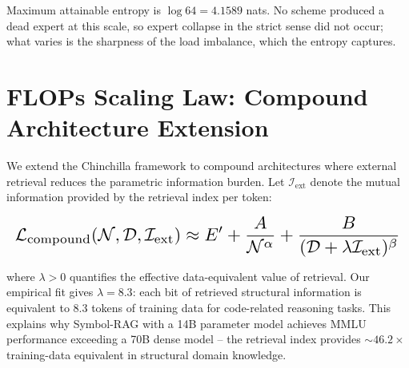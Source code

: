 \documentclass[11pt,a4paper]{article}
\begin{document}
Maximum attainable entropy is $\log 64 = 4.1589$ nats. No scheme produced a dead expert at this scale, so expert collapse in the strict sense did not occur; what varies is the sharpness of the load imbalance, which the entropy captures.



\section{FLOPs Scaling Law: Compound Architecture Extension}


We extend the Chinchilla framework to compound architectures where external retrieval reduces the parametric information burden. Let $\mathcal{I}_{\text{ext}}$ denote the mutual information provided by the retrieval index per token:



























\begin{equation}
\resizebox{\columnwidth}{!}{$\displaystyle
\begin{aligned}
\mathcal{L}_{\text{compound}}(\mathcal{N}, \mathcal{D}, \mathcal{I}_{\text{ext}}) \approx E' + \frac{A}{\mathcal{N}^\alpha} + \frac{B}{(\mathcal{D} + \lambda\mathcal{I}_{\text{ext}})^\beta}
\end{aligned}
$}
\end{equation}



























where $\lambda > 0$ quantifies the effective data-equivalent value of retrieval. Our empirical fit gives $\lambda = 8.3$: each bit of retrieved structural information is equivalent to 8.3 tokens of training data for code-related reasoning tasks. This explains why Symbol-RAG with a 14B parameter model achieves MMLU performance exceeding a 70B dense model -- the retrieval index provides $\sim 46.2\times$ training-data equivalent in structural domain knowledge.
\end{document}
